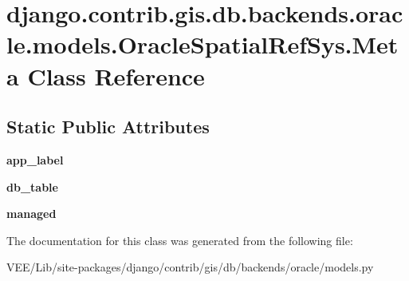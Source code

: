 \hypertarget{classdjango_1_1contrib_1_1gis_1_1db_1_1backends_1_1oracle_1_1models_1_1_oracle_spatial_ref_sys_1_1_meta}{}\section{django.\+contrib.\+gis.\+db.\+backends.\+oracle.\+models.\+Oracle\+Spatial\+Ref\+Sys.\+Meta Class Reference}
\label{classdjango_1_1contrib_1_1gis_1_1db_1_1backends_1_1oracle_1_1models_1_1_oracle_spatial_ref_sys_1_1_meta}
\subsection*{Static Public Attributes}
\begin{DoxyCompactItemize}
\item 
\mbox{\label{classdjango_1_1contrib_1_1gis_1_1db_1_1backends_1_1oracle_1_1models_1_1_oracle_spatial_ref_sys_1_1_meta_aed4b7c685b6b250281df0428bebea0f6}} 
{\bfseries app\+\_\+label}
\item 
\mbox{\label{classdjango_1_1contrib_1_1gis_1_1db_1_1backends_1_1oracle_1_1models_1_1_oracle_spatial_ref_sys_1_1_meta_a7ef867de404e825f0637e6b909153d86}} 
{\bfseries db\+\_\+table}
\item 
\mbox{\label{classdjango_1_1contrib_1_1gis_1_1db_1_1backends_1_1oracle_1_1models_1_1_oracle_spatial_ref_sys_1_1_meta_a48d2b576a7a5abe96a1dc31767bd9951}} 
{\bfseries managed}
\end{DoxyCompactItemize}


The documentation for this class was generated from the following file\+:\begin{DoxyCompactItemize}
\item 
V\+E\+E/\+Lib/site-\/packages/django/contrib/gis/db/backends/oracle/models.\+py\end{DoxyCompactItemize}

